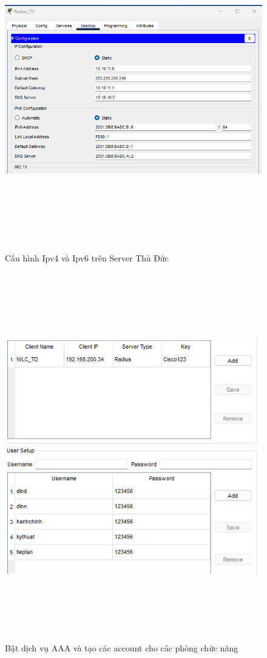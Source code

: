 \documentclass[a4paper, 12pt]{article}
\begin{document}
\begin{figure}[H]
    \centering
    \includegraphics[width=16cm, height=14cm]{img/4.2.5c.png}
    \caption{Cấu hình Ipv4 và Ipv6 trên Server Thủ Đức}
    \label{hinh425c}
\end{figure}

\begin{figure}[H]
    \centering
    \includegraphics[width=16cm, height=16cm]{img/4.2.5d.png}
    \caption{Bật dịch vụ AAA và tạo các account cho các phòng chức năng}
    \label{hinh425d}
\end{figure}
\end{document}
